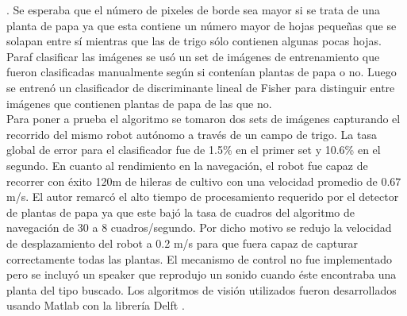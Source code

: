 	 \cite{Canny:1986:ACA}. Se esperaba que el número de pixeles de 
	 borde sea mayor si se trata de una planta de papa ya que esta 
	 contiene un número mayor de hojas pequeñas que se solapan entre sí 
	 mientras que las de trigo sólo contienen algunas pocas hojas. 
	 Paraf 
	 clasificar las imágenes se usó un set de imágenes de entrenamiento
	 que fueron clasificadas manualmente según si contenían 
	 plantas de papa o no. Luego se entrenó un 
	 clasificador de discriminante lineal de Fisher \cite{HastieEtAl2008} para distinguir 
	 entre imágenes que contienen plantas de papa de las que no.\\
	 \indent Para poner a prueba el algoritmo se tomaron dos sets de 
	 imágenes capturando el recorrido del mismo robot autónomo a 
	 través de un campo de trigo. La tasa global de error para el 
	 clasificador fue de 1.5\% en el primer set y 10.6\% en el 
	 segundo. En cuanto al rendimiento en la navegación, el robot 
	 fue capaz de recorrer con éxito 120m de hileras de cultivo con 
	 una velocidad promedio de $0.67$ m/s. El autor remarcó el alto 
	 tiempo de procesamiento requerido por el detector de plantas de 
	 papa ya que este bajó la tasa de cuadros del algoritmo de 
	 navegación de 30 a 8 cuadros/segundo. Por dicho motivo se 
	 redujo la velocidad de desplazamiento del robot a 0.2 m/s para 
	 que fuera capaz de capturar correctamente todas las plantas. 
	 El mecanismo de control no fue implementado pero se incluyó un 
	 speaker que reprodujo un sonido cuando éste encontraba una planta 
	 del tipo buscado. Los algoritmos de visión utilizados fueron 
	 desarrollados usando Matlab con la librería Delft \cite{DipLib}.
	 
